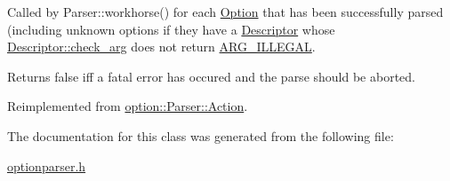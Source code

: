 Called by Parser\+::workhorse() for each \hyperlink{classoption_1_1Option}{Option} that has been successfully parsed (including unknown options if they have a \hyperlink{structoption_1_1Descriptor}{Descriptor} whose \hyperlink{structoption_1_1Descriptor_aa5d675dba0214a4abd73007ff163cc67}{Descriptor\+::check\+\_\+arg} does not return \hyperlink{namespaceoption_aee8c76a07877335762631491e7a5a1a9a9528e32563b795bd2930b12d0a5e382d}{A\+R\+G\+\_\+\+I\+L\+L\+E\+G\+AL}. 

Returns {\ttfamily false} iff a fatal error has occured and the parse should be aborted. 

Reimplemented from \hyperlink{structoption_1_1Parser_1_1Action_a176b5f783bb35eb015b6d2c09422457d}{option\+::\+Parser\+::\+Action}.



The documentation for this class was generated from the following file\+:\begin{DoxyCompactItemize}
\item 
\hyperlink{optionparser_8h}{optionparser.\+h}\end{DoxyCompactItemize}
